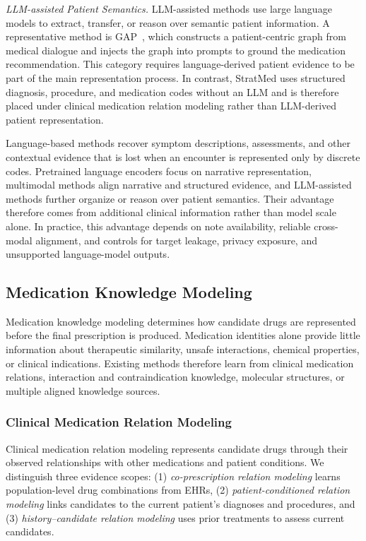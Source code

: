 \documentclass[manuscript,review]{acmart}
\begin{document}
\textit{LLM-assisted Patient Semantics.} LLM-assisted methods use large language models to extract, transfer, or reason over semantic patient information. A representative method is GAP~\cite{zhongGAPGraphAssistedPrompts2025c}, which constructs a patient-centric graph from medical dialogue and injects the graph into prompts to ground the medication recommendation. This category requires language-derived patient evidence to be part of the main representation process. In contrast, StratMed uses structured diagnosis, procedure, and medication codes without an LLM and is therefore placed under clinical medication relation modeling rather than LLM-derived patient representation.

Language-based methods recover symptom descriptions, assessments, and other contextual evidence that is lost when an encounter is represented only by discrete codes. Pretrained language encoders focus on narrative representation, multimodal methods align narrative and structured evidence, and LLM-assisted methods further organize or reason over patient semantics. Their advantage therefore comes from additional clinical information rather than model scale alone. In practice, this advantage depends on note availability, reliable cross-modal alignment, and controls for target leakage, privacy exposure, and unsupported language-model outputs.

\subsection{Medication Knowledge Modeling}

Medication knowledge modeling determines how candidate drugs are represented before the final prescription is produced. Medication identities alone provide little information about therapeutic similarity, unsafe interactions, chemical properties, or clinical indications. Existing methods therefore learn from clinical medication relations, interaction and contraindication knowledge, molecular structures, or multiple aligned knowledge sources.

\subsubsection{Clinical Medication Relation Modeling}

Clinical medication relation modeling represents candidate drugs through their observed relationships with other medications and patient conditions. We distinguish three evidence scopes: (1) \textit{co-prescription relation modeling} learns population-level drug combinations from EHRs, (2) \textit{patient-conditioned relation modeling} links candidates to the current patient's diagnoses and procedures, and (3) \textit{history--candidate relation modeling} uses prior treatments to assess current candidates.
\end{document}
